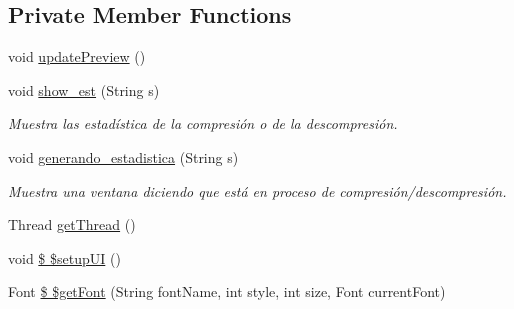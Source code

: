 \subsection*{Private Member Functions}
\begin{DoxyCompactItemize}
\item 
void \hyperlink{classpresentacion_1_1form_1_1mainForm_aa71c48a8ef6eb2b3913dd665e5439538}{update\+Preview} ()
\item 
void \hyperlink{classpresentacion_1_1form_1_1mainForm_a6eb9e9b4f7bb6da2c592a5a0294a6a06}{show\+\_\+est} (String s)
\begin{DoxyCompactList}\small\item\em Muestra las estadística de la compresión o de la descompresión. \end{DoxyCompactList}\item 
void \hyperlink{classpresentacion_1_1form_1_1mainForm_a34580a4b6e2c162d35ab5502f0ac7e4c}{generando\+\_\+estadistica} (String s)
\begin{DoxyCompactList}\small\item\em Muestra una ventana diciendo que está en proceso de compresión/descompresión. \end{DoxyCompactList}\item 
Thread \hyperlink{classpresentacion_1_1form_1_1mainForm_ac6348f8bdef39bfa651f145c00664320}{get\+Thread} ()
\item 
void \hyperlink{classpresentacion_1_1form_1_1mainForm_aed3c3dcfaece65c649c095e292eca671}{\$ \$setup\+UI} ()
\item 
Font \hyperlink{classpresentacion_1_1form_1_1mainForm_ac3c0e7ddfb95355efa609e2a7b85d34b}{\$ \$get\+Font} (String font\+Name, int style, int size, Font current\+Font)
\end{DoxyCompactItemize}
